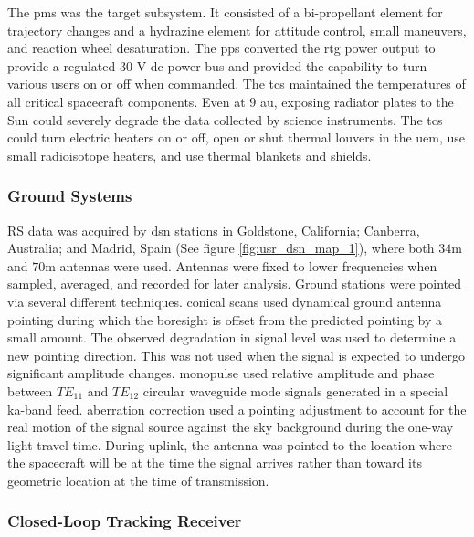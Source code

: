 \documentclass[oneside]{book}
\theoremstyle{mystyle}
\begin{document}
The \gls{pms} was the target subsystem. It consisted of a bi-propellant element for trajectory changes and a \gls{hydrazine} element for attitude control, small maneuvers, and reaction wheel desaturation. The \gls{pps} converted the \gls{rtg} power output to provide a regulated 30-V \gls{dc} power bus and provided the capability to turn various users on or off when commanded. The \gls{tcs} maintained the temperatures of all critical spacecraft components. Even at $9$ \gls{au}, exposing radiator plates to the Sun could severely degrade the data collected by science instruments. The \gls{tcs} could turn electric heaters on or off, open or shut thermal louvers in the \gls{uem}, use small radioisotope heaters, and use thermal blankets and shields.

\subsubsection{\footnotesize Ground Systems \label{subsubsec:usr_ground_sys}}

RS data was acquired by \gls{dsn} stations in Goldstone, California; Canberra, Australia; and Madrid, Spain (See figure \ref{fig:usr_dsn_map_1}), where both $34$m and $70$m antennas were used. Antennas were fixed to lower frequencies when sampled, averaged, and recorded for later analysis. Ground stations were pointed via several different techniques. \Glspl{conical scan} used dynamical ground antenna pointing during which the boresight is offset from the predicted pointing by a small amount. The observed degradation in signal level was used to determine a new pointing direction. This was not used when the signal is expected to undergo significant amplitude changes. \Gls{monopulse} used relative amplitude and phase between $TE_{11}$ and $TE_{12}$ circular \gls{waveguide} mode signals generated in a special \gls{ka-band} feed. \Gls{aberration correction} used a pointing adjustment to account for the real motion of the signal source against the sky background during the one-way light travel time. During \gls{uplink}, the antenna was pointed to the location where the spacecraft will be at the time the signal arrives rather than toward its geometric location at the time of transmission.

\subsubsection{\footnotesize Closed-Loop Tracking Receiver \label{subsubsec:usr_closed_loop_track_rec}}
\end{document}
